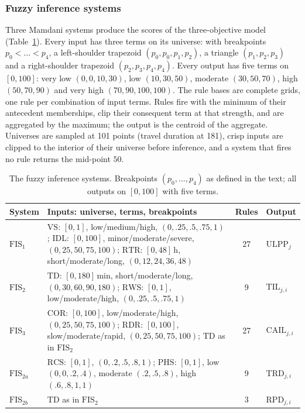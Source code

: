 \documentclass[systems,article,submit,moreauthors,pdftex]{Definitions/mdpi}
\begin{document}
\subsubsection{Fuzzy inference systems}
Three Mamdani systems produce the scores of the three-objective model
(Table~\ref{tab:fis}). Every input has three terms on its universe: with breakpoints
$p_0<\dots<p_4$, a left-shoulder trapezoid $(p_0,p_0,p_1,p_2)$, a triangle $(p_1,p_2,p_3)$ and a
right-shoulder trapezoid $(p_2,p_3,p_4,p_4)$. Every output has five terms on $[0,100]$: very low
$(0,0,10,30)$, low $(10,30,50)$, moderate $(30,50,70)$, high $(50,70,90)$ and very high
$(70,90,100,100)$. The rule bases are complete grids, one rule per combination of input terms.
Rules fire with the minimum of their antecedent memberships, clip their consequent term at
that strength, and are aggregated by the maximum; the output is the centroid of the
aggregate. Universes are sampled at 101 points (travel duration at 181), crisp inputs are
clipped to the interior of their universe before inference, and a system that fires no rule
returns the mid-point $50$.

\begin{table}[H]
\centering
\caption{The fuzzy inference systems. Breakpoints $(p_0,\dots,p_4)$ as defined in the text;
all outputs on $[0,100]$ with five terms.\label{tab:fis}}
\small
\begin{tabularx}{\textwidth}{@{}l>{\raggedright\arraybackslash}Xcl@{}}
\toprule
System & Inputs: universe, terms, breakpoints & Rules & Output\\
\midrule
$\mathrm{FIS}_1$ & $\mathrm{VS}$: $[0,1]$, low/medium/high, $(0,.25,.5,.75,1)$;
$\mathrm{IDL}$: $[0,100]$, minor/moderate/severe, $(0,25,50,75,100)$;
$\mathrm{RTR}$: $[0,48]$\,h, short/moderate/long, $(0,12,24,36,48)$ & 27 & $\mathrm{ULPP}_j$\\
$\mathrm{FIS}_2$ & $\mathrm{TD}$: $[0,180]$\,min, short/moderate/long, $(0,30,60,90,180)$;
$\mathrm{RWS}$: $[0,1]$, low/moderate/high, $(0,.25,.5,.75,1)$ & 9 & $\mathrm{TIL}_{j,i}$\\
$\mathrm{FIS}_3$ & $\mathrm{COR}$: $[0,100]$, low/moderate/high, $(0,25,50,75,100)$;
$\mathrm{RDR}$: $[0,100]$, slow/moderate/rapid, $(0,25,50,75,100)$;
$\mathrm{TD}$ as in $\mathrm{FIS}_2$ & 27 & $\mathrm{CAIL}_{j,i}$\\
\midrule
$\mathrm{FIS}_{2a}$ & $\mathrm{RCS}$: $[0,1]$, $(0,.2,.5,.8,1)$; $\mathrm{PHS}$: $[0,1]$, low
$(0,0,.2,.4)$, moderate $(.2,.5,.8)$, high $(.6,.8,1,1)$ & 9 & $\mathrm{TRD}_{j,i}$\\
$\mathrm{FIS}_{2b}$ & $\mathrm{TD}$ as in $\mathrm{FIS}_2$ & 3 & $\mathrm{RPD}_{j,i}$\\
\bottomrule
\end{tabularx}
\end{table}
\end{document}

